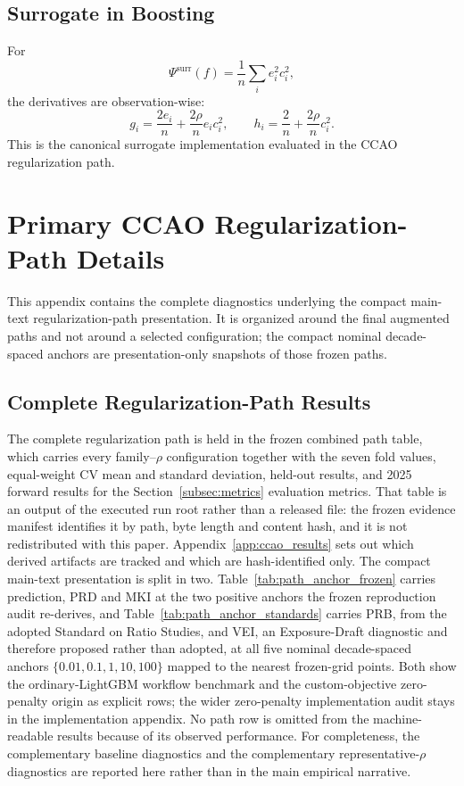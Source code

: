 \documentclass[10pt]{article}
\theoremstyle{definition}
\newcommand{\1}{\mathbf{1}}
\begin{document}
\subsection{Surrogate in Boosting}

For
\[
\Psi^{\mathrm{surr}}(f)
=
\frac{1}{n}\sum_i e_i^2c_i^2,
\]
the derivatives are observation-wise:
\[
g_i=\frac{2e_i}{n}+\frac{2\rho}{n}e_ic_i^2,
\qquad
h_i=\frac{2}{n}+\frac{2\rho}{n}c_i^2.
\]
This is the canonical surrogate implementation evaluated in the CCAO regularization path.


\section{\texorpdfstring{
Primary CCAO Regularization-Path Details}{Primary CCAO Regularization-Path Details}}
\label{app:ccao_path_details}


This appendix contains the complete diagnostics underlying the compact main-text regularization-path presentation. It is organized around the final augmented paths and not around a selected configuration; the compact nominal decade-spaced anchors are presentation-only snapshots of those frozen paths.

\subsection{Complete Regularization-Path Results}

The complete regularization path is held in the frozen combined path table, which carries every
family--$\rho$ configuration together with the seven fold values, equal-weight CV mean and
standard deviation, held-out results, and 2025 forward results for the
Section~\ref{subsec:metrics} evaluation metrics. That table is an output of the executed run root
rather than a released file: the frozen evidence manifest identifies it by path, byte length and
content hash, and it is not redistributed with this paper. Appendix~\ref{app:ccao_results} sets out
which derived artifacts are tracked and which are hash-identified only.
The compact main-text presentation is split in two. Table~\ref{tab:path_anchor_frozen} carries prediction, PRD and MKI at the two positive anchors the frozen reproduction audit re-derives, and Table~\ref{tab:path_anchor_standards} carries PRB, from the adopted Standard on Ratio Studies, and VEI, an Exposure-Draft diagnostic and therefore proposed rather than adopted, at all five nominal decade-spaced anchors $\{0.01,0.1,1,10,100\}$ mapped to the nearest frozen-grid points. Both show the ordinary-LightGBM workflow benchmark and the custom-objective zero-penalty origin as explicit rows; the wider zero-penalty implementation audit stays in the implementation appendix. No path row is omitted from the machine-readable results because of its observed performance.
For completeness, the complementary baseline diagnostics and the complementary representative-$\rho$ diagnostics are reported here rather than in the main empirical narrative.
\end{document}
